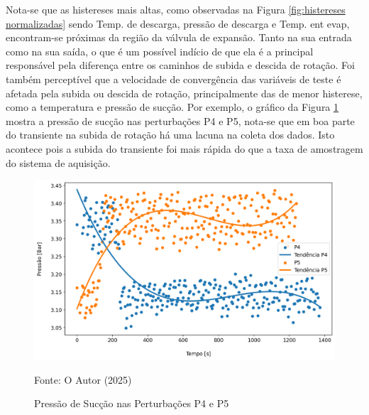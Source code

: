 Nota-se que as histereses mais altas, como observadas na Figura \ref{fig:histereses normalizadas} sendo Temp. de descarga, pressão de descarga e Temp. ent evap, encontram-se próximas da região da válvula de expansão. Tanto na sua entrada como na sua saída, o que é um possível indício de que ela é a principal responsável pela diferença entre os caminhos de subida e descida de rotação. Foi também perceptível que a velocidade de convergência das variáveis de teste é afetada pela subida ou descida de rotação, principalmente das de menor histerese, como a temperatura e pressão de sucção. Por exemplo, o gráfico da Figura \ref{fig:PressãodeSucçãoSubidaeDescida} mostra a pressão de sucção nas perturbações P4 e P5, nota-se que em boa parte do transiente na subida de rotação há uma lacuna na coleta dos dados. Isto acontece pois a subida do transiente foi mais rápida do que a taxa de amostragem do sistema de aquisição.
\newpage
\begin{figure}[h]
    \centering
    \includegraphics[width=1\linewidth]{FigurasdoTexto/Pressão de sucção subida e descida1.png}
    \caption{Pressão de Sucção nas Perturbações P4 e P5}
    \label{fig:PressãodeSucçãoSubidaeDescida}
    {\footnotesize Fonte: O Autor (2025)}
\end{figure}


